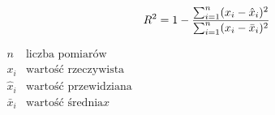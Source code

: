 \begin{equation}
    \label{eqn:r2}
    R^{2} =1 - \frac{\sum_{i=1}^n (x_{i}-\hat{x}_{i})^2}{\sum_{i=1}^n (x_{i}-\bar{x}_{i})^2}   \\[2ex]
\end{equation}
        
\noindent
$\displaystyle
\begin{array}{ll}
              n      & \text{liczba pomiarów}\\
            x_{i} & \text{wartość rzeczywista}\\
            \hat{x}_{i} & \text{wartość przewidziana} \\
            \bar{x}_{i} & \text{wartość średnia} x
\end{array}
$